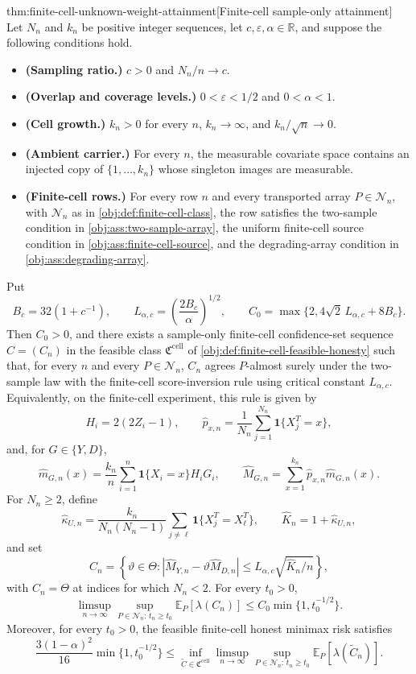\begin{theoremv}{thm:finite-cell-unknown-weight-attainment}[Finite-cell sample-only attainment]
Let \(N_n\) and \(k_n\) be positive integer sequences, let \(c,\varepsilon,\alpha\in\mathbb R\), and suppose the following conditions hold.
\begin{itemize}
\item \textbf{(Sampling ratio.)} \(c>0\) and \(N_n/n\to c\).
\item \textbf{(Overlap and coverage levels.)} \(0<\varepsilon<1/2\) and \(0<\alpha<1\).
\item \textbf{(Cell growth.)} \(k_n>0\) for every \(n\), \(k_n\to\infty\), and \(k_n/\sqrt n\to0\).
\item \textbf{(Ambient carrier.)} For every \(n\), the measurable covariate space contains an injected copy of \(\{1,\ldots,k_n\}\) whose singleton images are measurable.
\item \textbf{(Finite-cell rows.)} For every row \(n\) and every transported array \(P\in\mathcal N_n\), with \(\mathcal N_n\) as in \cref{obj:def:finite-cell-class}, the row satisfies the two-sample condition in \cref{obj:ass:two-sample-array}, the uniform finite-cell source condition in \cref{obj:ass:finite-cell-source}, and the degrading-array condition in \cref{obj:ass:degrading-array}.
\end{itemize}
Put
\[
B_c=32(1+c^{-1}),\qquad
L_{\alpha,c}=\left(\frac{2B_c}{\alpha}\right)^{1/2},\qquad
C_0=\max\{2,4\sqrt2\,L_{\alpha,c}+8B_c\}.
\]
Then \(C_0>0\), and there exists a sample-only finite-cell confidence-set sequence \(C=(C_n)\) in the feasible class \(\mathfrak C^{\mathrm{cell}}\) of \cref{obj:def:finite-cell-feasible-honesty} such that, for every \(n\) and every \(P\in\mathcal N_n\), \(C_n\) agrees \(P\)-almost surely under the two-sample law with the finite-cell score-inversion rule using critical constant \(L_{\alpha,c}\). Equivalently, on the finite-cell experiment, this rule is given by
\[
H_i=2(2Z_i-1),\qquad
\widehat p_{x,n}=\frac1{N_n}\sum_{j=1}^{N_n}\mathbf 1\{X_j^T=x\},
\]
and, for \(G\in\{Y,D\}\),
\[
\widehat m_{G,n}(x)=\frac{k_n}{n}\sum_{i=1}^n
\mathbf 1\{X_i=x\}H_iG_i,\qquad
\widehat M_{G,n}=\sum_{x=1}^{k_n}\widehat p_{x,n}\widehat m_{G,n}(x).
\]
For \(N_n\ge2\), define
\[
\widehat\kappa_{U,n}
=\frac{k_n}{N_n(N_n-1)}
\sum_{j\ne\ell}\mathbf 1\{X_j^T=X_\ell^T\},\qquad
\widehat K_n=1+\widehat\kappa_{U,n},
\]
and set
\[
C_n=\left\{\vartheta\in\Theta:
|\widehat M_{Y,n}-\vartheta\widehat M_{D,n}|
\le L_{\alpha,c}\sqrt{\widehat K_n/n}\right\},
\]
with \(C_n=\Theta\) at indices for which \(N_n<2\). For every \(t_0>0\),
\[
\limsup_{n\to\infty}\sup_{P\in\mathcal N_n:\,t_n\ge t_0}
\mathbb E_P[\lambda(C_n)]
\le
C_0\min\{1,t_0^{-1/2}\}.
\]
Moreover, for every \(t_0>0\), the feasible finite-cell honest minimax risk satisfies
\[
\frac{3(1-\alpha)^2}{16}\min\{1,t_0^{-1/2}\}
\le
\inf_{\widetilde C\in\mathfrak C^{\mathrm{cell}}}
\limsup_{n\to\infty}\sup_{P\in\mathcal N_n:\,t_n\ge t_0}
\mathbb E_P[\lambda(\widetilde C_n)].
\]
\end{theoremv}

